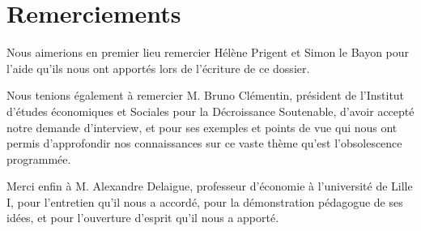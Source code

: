 
\chapter*{Remerciements}



Nous aimerions en premier lieu remercier Hélène Prigent et Simon le Bayon pour l'aide qu'ils nous ont apportés lors de l'écriture de ce dossier.

\bigbreak Nous tenions également à remercier M. Bruno Clémentin, président de l'Institut d'études économiques et Sociales pour la Décroissance Soutenable, d'avoir accepté notre demande d'interview, et pour ses exemples et points de vue qui nous ont permis d'approfondir nos connaissances sur ce vaste thème qu'est l'obsolescence programmée.

\bigbreak
Merci enfin à M. Alexandre Delaigue, professeur d'économie à l'université de Lille I, pour l'entretien qu'il nous a accordé, pour la démonstration pédagogue de ses idées, et pour l'ouverture d'esprit qu'il nous a apporté.
